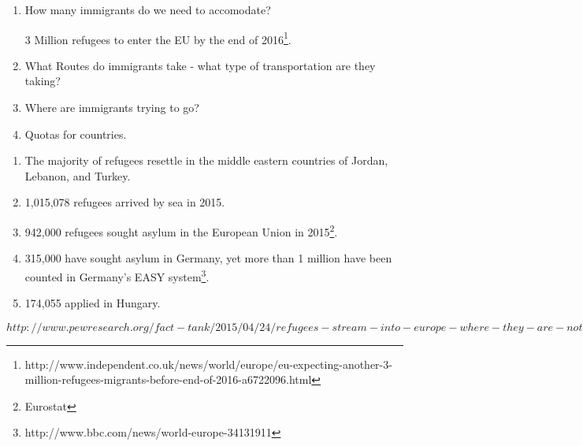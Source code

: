 \begin{enumerate}
    \item How many immigrants do we need to accomodate?

    3 Million refugees to enter the EU by the end of 2016\footnote{http://www.independent.co.uk/news/world/europe/eu-expecting-another-3-million-refugees-migrants-before-end-of-2016-a6722096.html}.

    \item What Routes do immigrants take - what type of transportation are they taking?

    \item Where are immigrants trying to go?

    \item Quotas for countries.
\end{enumerate}

\begin{enumerate}
    \item The majority of refugees resettle in the middle eastern countries of Jordan, Lebanon, and Turkey.
    \item 1,015,078 refugees arrived by sea in 2015.
    \item 942,000 refugees sought asylum in the European Union in 2015\footnote{Eurostat}.
    \item 315,000 have sought asylum in Germany, yet more than 1 million have been counted in Germany's EASY system\footnote{http://www.bbc.com/news/world-europe-34131911}.
    \item 174,055 applied in Hungary.
\end{enumerate}

$http://www.pewresearch.org/fact-tank/2015/04/24/refugees-stream-into-europe-where-they-are-not-welcomed-with-open-arms/ft_15-04-22_eu-immigration/$


